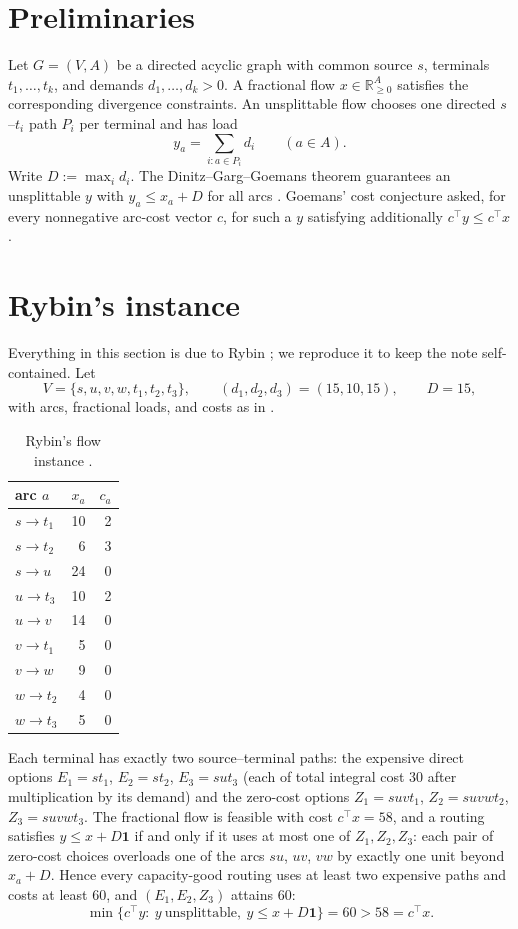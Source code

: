 \documentclass[11pt]{article}
\theoremstyle{definition}
\newcommand{\R}{\mathbb{R}}
\newcommand{\one}{\mathbf{1}}
\begin{document}
\section{Preliminaries}

Let $G=(V,A)$ be a directed acyclic graph with common source $s$, terminals
$t_1,\dots,t_k$, and demands $d_1,\dots,d_k>0$.  A fractional flow
$x\in\R_{\ge0}^{A}$ satisfies the corresponding divergence constraints.  An
unsplittable flow chooses one directed $s$--$t_i$ path $P_i$ per terminal and
has load
\[
 y_a=\sum_{i:a\in P_i} d_i \qquad (a\in A).
\]
Write $D:=\max_i d_i$.  The Dinitz--Garg--Goemans theorem guarantees an
unsplittable $y$ with $y_a\le x_a+D$ for all arcs
\cite{DinitzGargGoemans1999}.  Goemans' cost conjecture asked, for every
nonnegative arc-cost vector $c$, for such a $y$ satisfying additionally
$c^\top y\le c^\top x$.

\section{Rybin's instance}\label{sec:instance}

Everything in this section is due to Rybin \citep{Rybin2026}; we reproduce it
to keep the note self-contained.  Let
\[
 V=\{s,u,v,w,t_1,t_2,t_3\},
 \qquad
 (d_1,d_2,d_3)=(15,10,15),
 \qquad D=15,
\]
with arcs, fractional loads, and costs as in .

\begin{table}[ht]
\centering
\caption{Rybin's flow instance \citep{Rybin2026}.}
\label{tab:arcs}
\begin{tabular}{@{}lrr@{}}
\toprule
arc $a$ & $x_a$ & $c_a$\\
\midrule
$s\to t_1$ & 10 & 2\\
$s\to t_2$ & 6 & 3\\
$s\to u$   & 24 & 0\\
$u\to t_3$ & 10 & 2\\
$u\to v$   & 14 & 0\\
$v\to t_1$ & 5 & 0\\
$v\to w$   & 9 & 0\\
$w\to t_2$ & 4 & 0\\
$w\to t_3$ & 5 & 0\\
\bottomrule
\end{tabular}
\end{table}

Each terminal has exactly two source--terminal paths: the expensive direct
options $E_1=st_1$, $E_2=st_2$, $E_3=sut_3$ (each of total integral cost $30$
after multiplication by its demand) and the zero-cost options $Z_1=suvt_1$,
$Z_2=suvwt_2$, $Z_3=suvwt_3$.  The fractional flow is feasible with cost
$c^\top x=58$, and a routing satisfies $y\le x+D\one$ if and only if it uses
at most one of $Z_1,Z_2,Z_3$: each pair of zero-cost choices overloads one of
the arcs $su$, $uv$, $vw$ by exactly one unit beyond $x_a+D$.  Hence every
capacity-good routing uses at least two expensive paths and costs at least
$60$, and $(E_1,E_2,Z_3)$ attains $60$:
\[
 \min\{c^\top y:\ y\ \text{unsplittable},\ y\le x+D\one\}=60>58=c^\top x .
\]
\end{document}
